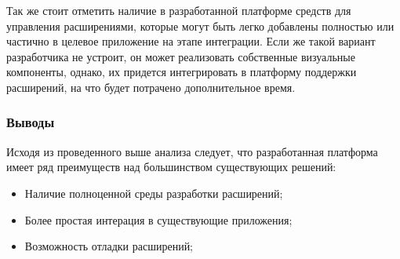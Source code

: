 Так же стоит отметить наличие в разработанной платформе средств для управления расширениями, которые могут быть легко добавлены полностью или частично в целевое приложение на этапе интеграции. Если же такой вариант разработчика не устроит, он может реализовать собственные визуальные компоненты, однако, их придется интегрировать в платформу поддержки расширений, на что будет потрачено дополнительное время.

\subsubsection{Выводы}

Исходя из проведенного выше анализа следует, что разработанная платформа имеет ряд преимуществ над большинством существующих решений:

\begin{itemize}
   \item Наличие полноценной среды разработки расширений;
   \item Более простая интерация в существующие приложения;
   \item Возможность отладки расширений;
\end{itemize}

\pagebreak
